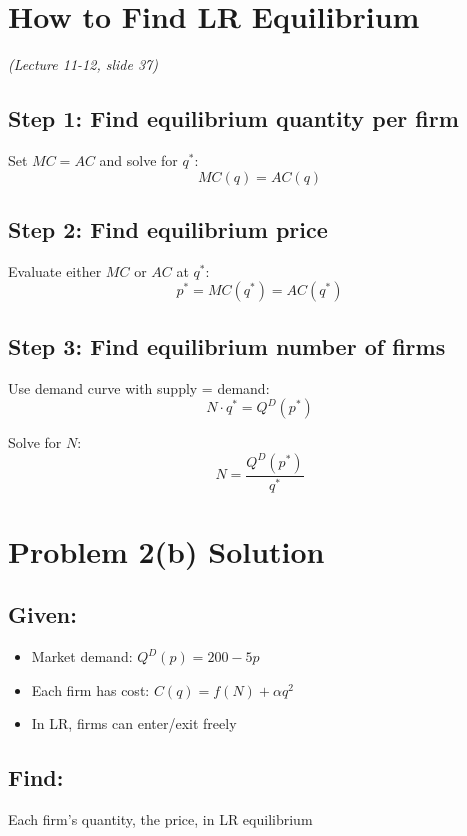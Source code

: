\documentclass[11pt]{article}
\begin{document}
\section{How to Find LR Equilibrium}
\textit{(Lecture 11-12, slide 37)}

\subsection*{Step 1: Find equilibrium quantity per firm}

Set $MC = AC$ and solve for $q^*$:
\[
MC(q) = AC(q)
\]

\subsection*{Step 2: Find equilibrium price}

Evaluate either $MC$ or $AC$ at $q^*$:
\[
p^* = MC(q^*) = AC(q^*)
\]

\subsection*{Step 3: Find equilibrium number of firms}

Use demand curve with supply = demand:
\[
N \cdot q^* = Q^D(p^*)
\]

Solve for $N$:
\[
N = \frac{Q^D(p^*)}{q^*}
\]

\newpage

\section{Problem 2(b) Solution}

\subsection*{Given:}
\begin{itemize}[leftmargin=*]
    \item Market demand: $Q^D(p) = 200 - 5p$
    \item Each firm has cost: $C(q) = f(N) + \alpha q^2$
    \item In LR, firms can enter/exit freely
\end{itemize}

\subsection*{Find:} Each firm's quantity, the price, in LR equilibrium
\end{document}
